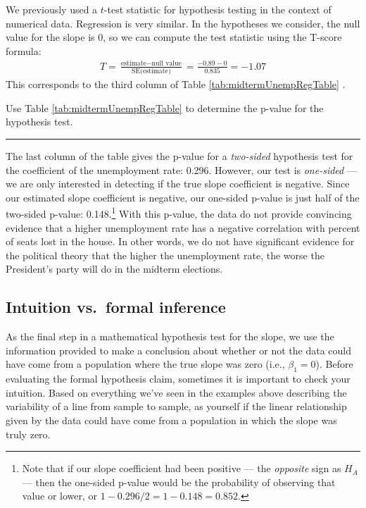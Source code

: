 \documentclass[
  10pt,
  openany]{book}
\theoremstyle{definition}
\theoremstyle{definition}
\theoremstyle{definition}
\theoremstyle{definition}
\theoremstyle{remark}
\begin{document}
We previously used a \(t\)-test statistic for hypothesis testing in the
context of numerical data. Regression is very similar. In the hypotheses
we consider, the null value for the slope is 0, so we can compute the
test statistic using the T-score formula:
\[\begin{aligned}
T
  = \frac{\text{estimate} - \text{null value}}{\text{SE(estimate)}}
  = \frac{-0.89 - 0}{0.835}
  = -1.07\end{aligned}\] This corresponds to the third column of
Table \ref{tab:midtermUnempRegTable} .

Use Table \ref{tab:midtermUnempRegTable} to determine the p-value for the
hypothesis test.

\begin{center}\rule{0.5\linewidth}{0.5pt}\end{center}

The last column of the table gives the p-value for a
\emph{two-sided} hypothesis test for the coefficient of the unemployment rate:
0.296. However, our test is \emph{one-sided} --- we are only interested in detecting if the true slope coefficient is negative. Since our estimated slope coefficient is negative, our one-sided p-value is just half of the two-sided p-value: 0.148.\footnote{Note that if our slope coefficient had been positive --- the \emph{opposite} sign as \(H_A\) --- then the one-sided p-value would be the probability of observing that value or lower, or \(1 - 0.296/2 = 1 - 0.148 = 0.852\).} With this p-value, the data do not provide convincing evidence that a
higher unemployment rate has a negative correlation with percent of seats lost in the house. In other words, we do not have significant evidence for the political theory that the higher the unemployment rate, the worse the President's party will do in the midterm elections.

\subsection{Intuition vs.~formal inference}\label{intuition-vs.-formal-inference}

As the final step in a mathematical hypothesis test for the slope, we use the information provided to make a conclusion about whether or not the data could have come from a population where the true slope was zero (i.e., \(\beta_1 = 0\)). Before evaluating the formal hypothesis claim, sometimes it is important to check your intuition. Based on everything we've seen in the examples above describing the variability of a line from sample to sample, as yourself if the linear relationship given by the data could have come from a population in which the slope was truly zero.
\end{document}
